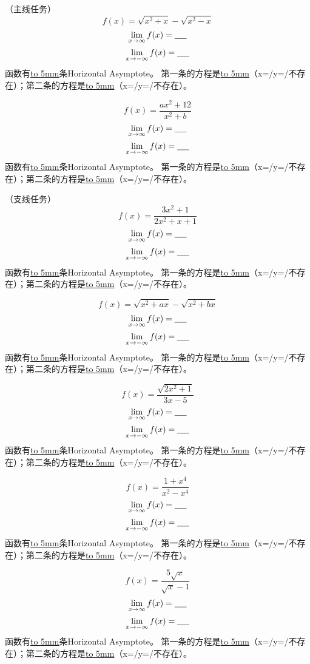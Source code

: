 \documentclass[UTF8]{ctexart}
\begin{document}
（主线任务）
\[f(x) = \sqrt{x^2+x} - \sqrt{x^2-x}\]
\[{\lim_{x \to \infty} f(x) = \underline{\hbox to 5mm{}}}\]
\[{\lim_{x \to -\infty} f(x) = \underline{\hbox to 5mm{}}}\]
函数有\underline{\hbox to 5mm{}}条Horizontal Asymptote。
第一条的方程是\underline{\hbox to 5mm{}}（x=/y=/不存在）；第二条的方程是\underline{\hbox to 5mm{}}（x=/y=/不存在）。

\[f(x) = \frac{ax^2+12}{x^2+b}\]
\[{\lim_{x \to \infty} f(x) = \underline{\hbox to 5mm{}}}\]
\[{\lim_{x \to -\infty} f(x) = \underline{\hbox to 5mm{}}}\]
函数有\underline{\hbox to 5mm{}}条Horizontal Asymptote。
第一条的方程是\underline{\hbox to 5mm{}}（x=/y=/不存在）；第二条的方程是\underline{\hbox to 5mm{}}（x=/y=/不存在）。

（支线任务）
\[f(x) = \frac{3x^2+1}{2x^2+x+1}\]
\[{\lim_{x \to \infty} f(x) = \underline{\hbox to 5mm{}}}\]
\[{\lim_{x \to -\infty} f(x) = \underline{\hbox to 5mm{}}}\]
函数有\underline{\hbox to 5mm{}}条Horizontal Asymptote。
第一条的方程是\underline{\hbox to 5mm{}}（x=/y=/不存在）；第二条的方程是\underline{\hbox to 5mm{}}（x=/y=/不存在）。

\[f(x) = \sqrt{x^2+ax} - \sqrt{x^2+bx}\]
\[{\lim_{x \to \infty} f(x) = \underline{\hbox to 5mm{}}}\]
\[{\lim_{x \to -\infty} f(x) = \underline{\hbox to 5mm{}}}\]
函数有\underline{\hbox to 5mm{}}条Horizontal Asymptote。
第一条的方程是\underline{\hbox to 5mm{}}（x=/y=/不存在）；第二条的方程是\underline{\hbox to 5mm{}}（x=/y=/不存在）。

\[f(x) = \frac{\sqrt{2x^2+1}}{3x-5}\]
\[{\lim_{x \to \infty} f(x) = \underline{\hbox to 5mm{}}}\]
\[{\lim_{x \to -\infty} f(x) = \underline{\hbox to 5mm{}}}\]
函数有\underline{\hbox to 5mm{}}条Horizontal Asymptote。
第一条的方程是\underline{\hbox to 5mm{}}（x=/y=/不存在）；第二条的方程是\underline{\hbox to 5mm{}}（x=/y=/不存在）。

\[f(x) = \frac{1+x^4}{x^2-x^4}\]
\[{\lim_{x \to \infty} f(x) = \underline{\hbox to 5mm{}}}\]
\[{\lim_{x \to -\infty} f(x) = \underline{\hbox to 5mm{}}}\]
函数有\underline{\hbox to 5mm{}}条Horizontal Asymptote。
第一条的方程是\underline{\hbox to 5mm{}}（x=/y=/不存在）；第二条的方程是\underline{\hbox to 5mm{}}（x=/y=/不存在）。

\[f(x) = \frac{5\sqrt{x}}{\sqrt{x}-1}\]
\[{\lim_{x \to \infty} f(x) = \underline{\hbox to 5mm{}}}\]
\[{\lim_{x \to -\infty} f(x) = \underline{\hbox to 5mm{}}}\]
函数有\underline{\hbox to 5mm{}}条Horizontal Asymptote。
第一条的方程是\underline{\hbox to 5mm{}}（x=/y=/不存在）；第二条的方程是\underline{\hbox to 5mm{}}（x=/y=/不存在）。
\end{document}
